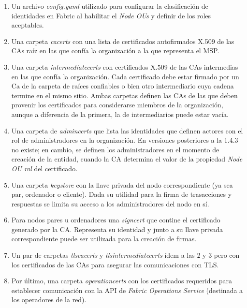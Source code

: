 \begin{enumerate}
	\item Un archivo \emph{config.yaml} utilizado para configurar la clasificaci\'on de identidades en Fabric al habilitar el \emph{Node OUs} y definir de los roles aceptables.
	
	\item Una carpeta \emph{cacerts} con una lista de certificados autofirmados X.509 de las CAs ra\'iz en las que conf\'ia la organizaci\'on a la que representa el MSP.
	
	\item Una carpeta \emph{intermediatecerts} con certificados X.509 de las CAs intermedias en las que conf\'ia la organizaci\'on. Cada certificado debe estar firmado por un Ca de la carpeta de ra\'ices confiables o bien otro intermediario cuya cadena termine en el mismo sitio. Ambas carpetas definen las CAs de las que deben provenir los certificados para considerarse miembros de la organizaci\'on, aunque a diferencia de la primera, la de intermediarios puede estar vac\'ia.
	
	\item Una carpeta de \emph{admincerts} que lista las identidades que definen actores con el rol de administradores en la organizaci\'on. En versiones posteriores a la 1.4.3 no existe; en cambio, se definen los administradores en el momento de creaci\'on de la entidad, cuando la CA determina el valor de la propiedad \emph{Node OU rol} del certificado.
	
	
	\item Una carpeta \emph{keystore} con la llave privada del nodo correspondiente (ya sea par, ordenador o cliente). Dada su utilidad para la firma de trasacciones y respuestas se limita su acceso a los administradores del nodo en s\'i. 
	
	\item Para nodos pares u ordenadores una \emph{signcert} que contine el certificado generado por la CA. Representa su identidad y junto a su llave privada correspondiente puede ser utilizada para la creaci\'on de firmas.
	
	\item Un par de carpetas \emph{tlscacerts} y \emph{tlsintermediatecerts} \'idem a las 2 y 3 pero con los certificados de las CAs para asegurar las comunicaciones con TLS.
	
	\item Por \'ultimo, una carpeta \emph{operationcerts} con los certificados requeridos para establecer comunicaci\'on con la API de \emph{Fabric Operations Service} (destinada a los operadores de la red).
\end{enumerate}


